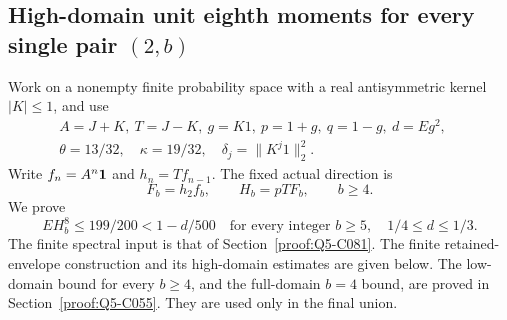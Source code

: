 \subsection{High-domain unit eighth moments for every single pair \((2,\allowbreak b)\)}\label{proof:Q5-C057}
Work on a nonempty finite probability space with a real antisymmetric kernel \(|K|\le\allowbreak 1\), and use
\[
\begin{gathered}
A=J+K,\ T=J-K,\ g=K1,\ p=1+g,\ q=1-g,\ d=Eg^2,\quad\\
\theta=13/32,\quad\kappa=19/32,\quad \delta_j=\|K^j1\|_2^2 .
\end{gathered}
\]
Write \(f_n=\allowbreak A^n\mathbf1\) and \(h_n=\allowbreak Tf_{n-1}\). The fixed actual direction is
\[
F_b=h_2f_b,\qquad H_b=pT F_b,\qquad b\ge4.
\]
We prove
\[
\boxed{EH_b^8\le199/200<1-d/500
\quad\text{for every integer }b\ge5,\quad1/4\le d\le1/3.} \tag{Q57.0.1}\label{eq:Q57:0.1}
\]
The finite spectral input is that of Section~\ref{proof:Q5-C081}. The finite retained-envelope construction and its high-domain estimates are given below. The low-domain bound for every \(b\ge\allowbreak 4\), and the full-domain \(b=\allowbreak 4\) bound, are proved in Section~\ref{proof:Q5-C055}. They are used only in the final union.

